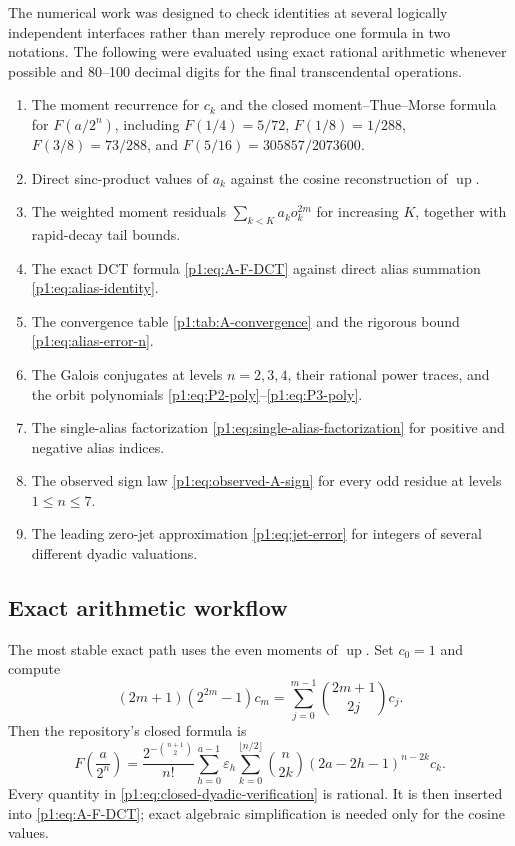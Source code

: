 \documentclass[11pt,oneside]{article}
\theoremstyle{definition}
\theoremstyle{remark}
\newcommand{\Up}{\operatorname{up}}
\newcommand{\eps}{\varepsilon}
\begin{document}
The numerical work was designed to check identities at several logically
independent interfaces rather than merely reproduce one formula in two notations.
The following were evaluated using exact rational arithmetic whenever possible
and 80--100 decimal digits for the final transcendental operations.
\begin{enumerate}
 \item The moment recurrence for $c_k$ and the closed moment--Thue--Morse formula
 for $F(a/2^n)$, including
 $F(1/4)=5/72$, $F(1/8)=1/288$,
 $F(3/8)=73/288$, and
 $F(5/16)=305857/2073600$.
 \item Direct sinc-product values of $a_k$ against the cosine reconstruction of
 $\Up$.
 \item The weighted moment residuals
 $\sum_{k<K}a_ko_k^{2m}$ for increasing $K$, together with rapid-decay tail
 bounds.
 \item The exact DCT formula \eqref{p1:eq:A-F-DCT} against direct alias summation
 \eqref{p1:eq:alias-identity}.
 \item The convergence table \cref{p1:tab:A-convergence} and the rigorous bound
 \eqref{p1:eq:alias-error-n}.
 \item The Galois conjugates at levels $n=2,3,4$, their rational power traces,
 and the orbit polynomials \eqref{p1:eq:P2-poly}--\eqref{p1:eq:P3-poly}.
 \item The single-alias factorization \eqref{p1:eq:single-alias-factorization} for
 positive and negative alias indices.
 \item The observed sign law \eqref{p1:eq:observed-A-sign} for every odd residue at
 levels $1\le n\le7$.
 \item The leading zero-jet approximation \eqref{p1:eq:jet-error} for integers of
 several different dyadic valuations.
\end{enumerate}

\subsection{Exact arithmetic workflow}

The most stable exact path uses the even moments of $\Up$.  Set $c_0=1$ and
compute
\begin{equation}\label{p1:eq:c-recurrence-verification}
 (2m+1)(2^{2m}-1)c_m
 =\sum_{j=0}^{m-1}\binom{2m+1}{2j}c_j.
\end{equation}
Then the repository's closed formula is
\begin{equation}\label{p1:eq:closed-dyadic-verification}
 F\!\left(\frac a{2^n}\right)
 =\frac{2^{-\binom{n+1}{2}}}{n!}
 \sum_{h=0}^{a-1}\eps_h
 \sum_{k=0}^{\lfloor n/2\rfloor}
 \binom n{2k}(2a-2h-1)^{n-2k}c_k.
\end{equation}
Every quantity in \eqref{p1:eq:closed-dyadic-verification} is rational.  It is
then inserted into \eqref{p1:eq:A-F-DCT}; exact algebraic simplification is needed
only for the cosine values.
\end{document}
